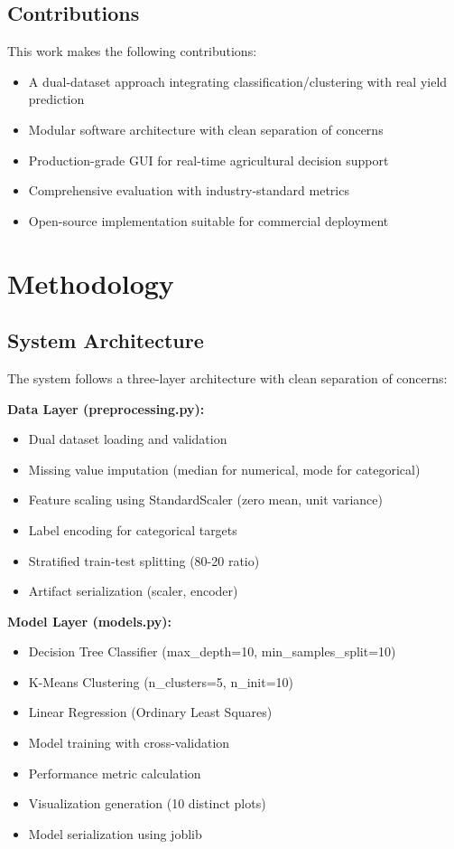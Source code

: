 \documentclass[conference]{IEEEtran}
\begin{document}
\subsection{Contributions}
This work makes the following contributions:
\begin{itemize}
    \item A dual-dataset approach integrating classification/clustering with real yield prediction
    \item Modular software architecture with clean separation of concerns
    \item Production-grade GUI for real-time agricultural decision support
    \item Comprehensive evaluation with industry-standard metrics
    \item Open-source implementation suitable for commercial deployment
\end{itemize}

\section{Methodology}

\subsection{System Architecture}
The system follows a three-layer architecture with clean separation of concerns:

\textbf{Data Layer (preprocessing.py):}
\begin{itemize}
    \item Dual dataset loading and validation
    \item Missing value imputation (median for numerical, mode for categorical)
    \item Feature scaling using StandardScaler (zero mean, unit variance)
    \item Label encoding for categorical targets
    \item Stratified train-test splitting (80-20 ratio)
    \item Artifact serialization (scaler, encoder)
\end{itemize}

\textbf{Model Layer (models.py):}
\begin{itemize}
    \item Decision Tree Classifier (max\_depth=10, min\_samples\_split=10)
    \item K-Means Clustering (n\_clusters=5, n\_init=10)
    \item Linear Regression (Ordinary Least Squares)
    \item Model training with cross-validation
    \item Performance metric calculation
    \item Visualization generation (10 distinct plots)
    \item Model serialization using joblib
\end{itemize}
\end{document}
